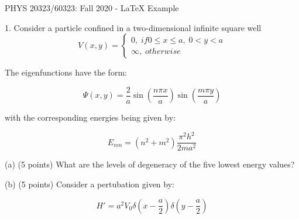 \documentclass[12pt]{article}
\begin{document}
\def\pos{\medskip\quad}
\def\subpos{\smallskip \qquad}
\begin{center}
{\large
PHYS 20323/60323: Fall 2020 - LaTeX Example}\\
\end{center}
\begin{description} 
\item 1. Consider a particle confined in a two-dimensional infinite square well  %
\begin{equation*}
V(x,y)=
\begin{cases}
	0,\;  if 0 \leq x \leq a, \; 0<y<a\\ 	
	\infty,\;  otherwise 
\end{cases}
\end{equation*}
\end{description}
\begin{description}
\item The eigenfunctions have the form: %
\end{description}
\begin{equation*}
\Psi(x,y)=
\frac{2}{a} \sin \left(\frac{n\pi x}{a}\right) \sin\left(\frac{m\pi y}{a}\right)
\end{equation*}
\begin{description}
\item with the corresponding energies being given by: %
\end{description}
\begin{equation*}
E_{nm} =
\left(n^2 + m^2\right) \frac{\pi^2 h^2}{2ma^2}
\end{equation*}	
\begin{description}
\item(a) (5 points) What are the levels of degeneracy of the five lowest energy values? 
\item(b) (5 points) Consider a pertubation given by: 
\end{description}
\begin{equation*}
{H}' =
a^2V_0\delta \left(x-\frac{a}{2}\right)\delta \left(y- \frac{a}{2}\right)
\end{equation*}	
\end{document}
